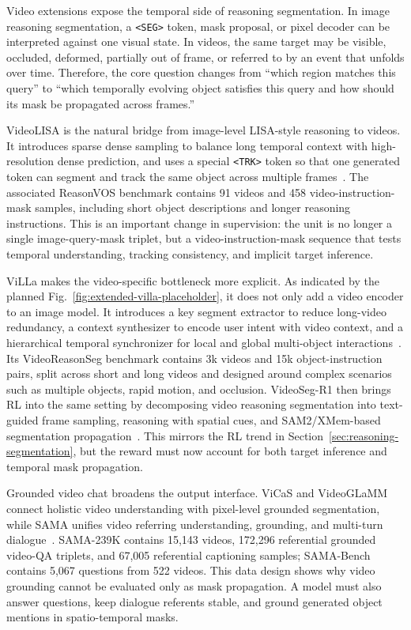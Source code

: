 Video extensions expose the temporal side of reasoning segmentation. In image reasoning segmentation, a \texttt{<SEG>} token, mask proposal, or pixel decoder can be interpreted against one visual state. In videos, the same target may be visible, occluded, deformed, partially out of frame, or referred to by an event that unfolds over time. Therefore, the core question changes from ``which region matches this query'' to ``which temporally evolving object satisfies this query and how should its mask be propagated across frames.''

VideoLISA is the natural bridge from image-level LISA-style reasoning to videos. It introduces sparse dense sampling to balance long temporal context with high-resolution dense prediction, and uses a special \texttt{<TRK>} token so that one generated token can segment and track the same object across multiple frames~\citep{baiOneTokenSeg2024}. The associated ReasonVOS benchmark contains 91 videos and 458 video-instruction-mask samples, including short object descriptions and longer reasoning instructions. This is an important change in supervision: the unit is no longer a single image-query-mask triplet, but a video-instruction-mask sequence that tests temporal understanding, tracking consistency, and implicit target inference.



ViLLa makes the video-specific bottleneck more explicit. As indicated by the planned Fig.~\ref{fig:extended-villa-placeholder}, it does not only add a video encoder to an image model. It introduces a key segment extractor to reduce long-video redundancy, a context synthesizer to encode user intent with video context, and a hierarchical temporal synchronizer for local and global multi-object interactions~\citep{zhengVillaVideoReasoning2025}. Its VideoReasonSeg benchmark contains 3k videos and 15k object-instruction pairs, split across short and long videos and designed around complex scenarios such as multiple objects, rapid motion, and occlusion. VideoSeg-R1 then brings RL into the same setting by decomposing video reasoning segmentation into text-guided frame sampling, reasoning with spatial cues, and SAM2/XMem-based segmentation propagation~\citep{xuVideosegr1ReasoningVideo2026}. This mirrors the RL trend in Section~\ref{sec:reasoning-segmentation}, but the reward must now account for both target inference and temporal mask propagation.

Grounded video chat broadens the output interface. ViCaS and VideoGLaMM connect holistic video understanding with pixel-level grounded segmentation, while SAMA unifies video referring understanding, grounding, and multi-turn dialogue~\citep{atharVicasDatasetCombining2025,munasingheVideoglammLargeMultimodal2025,sunSamaMultiturnReferential2026}. SAMA-239K contains 15,143 videos, 172,296 referential grounded video-QA triplets, and 67,005 referential captioning samples; SAMA-Bench contains 5,067 questions from 522 videos. This data design shows why video grounding cannot be evaluated only as mask propagation. A model must also answer questions, keep dialogue referents stable, and ground generated object mentions in spatio-temporal masks.

